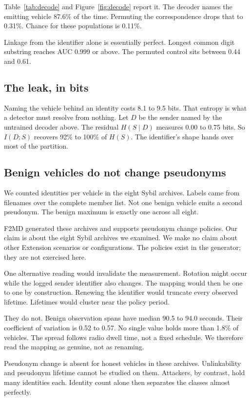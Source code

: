 \documentclass[journal,twoside]{IEEEtran}
\begin{document}
Table~\ref{tab:decode} and Figure~\ref{fig:decode} report it.
The decoder names the emitting vehicle 87.6\% of the time.
Permuting the correspondence drops that to 0.31\%.
Chance for these populations is 0.11\%.

Linkage from the identifier alone is essentially perfect.
Longest common digit substring reaches AUC 0.999 or above.
The permuted control sits between 0.44 and 0.61.

\subsection{The leak, in bits}

Naming the vehicle behind an identity costs 8.1 to 9.5 bits.
That entropy is what a detector must resolve from nothing.
Let $D$ be the sender named by the untrained decoder above.
The residual $H(S \mid D)$ measures 0.00 to 0.75 bits.
So $I(D;S)$ recovers 92\% to 100\% of $H(S)$.
The identifier's shape hands over most of the partition.

\subsection{Benign vehicles do not change pseudonyms}

We counted identities per vehicle in the eight Sybil archives.
Labels came from filenames over the complete member list.
Not one benign vehicle emits a second pseudonym.
The benign maximum is exactly one across all eight.

F2MD generated these archives and supports pseudonym change policies.
Our claim is about the eight Sybil archives we examined.
We make no claim about other Extension scenarios or configurations.
The policies exist in the generator; they are not exercised here.

One alternative reading would invalidate the measurement.
Rotation might occur while the logged sender identifier also changes.
The mapping would then be one to one by construction.
Renewing the identifier would truncate every observed lifetime.
Lifetimes would cluster near the policy period.

They do not.
Benign observation spans have median 90.5 to 94.0 seconds.
Their coefficient of variation is 0.52 to 0.57.
No single value holds more than 1.8\% of vehicles.
The spread follows radio dwell time, not a fixed schedule.
We therefore read the mapping as genuine, not as renaming.

Pseudonym change is absent for honest vehicles in these archives.
Unlinkability and pseudonym lifetime cannot be studied on them.
Attackers, by contrast, hold many identities each.
Identity count alone then separates the classes almost perfectly.
\end{document}
